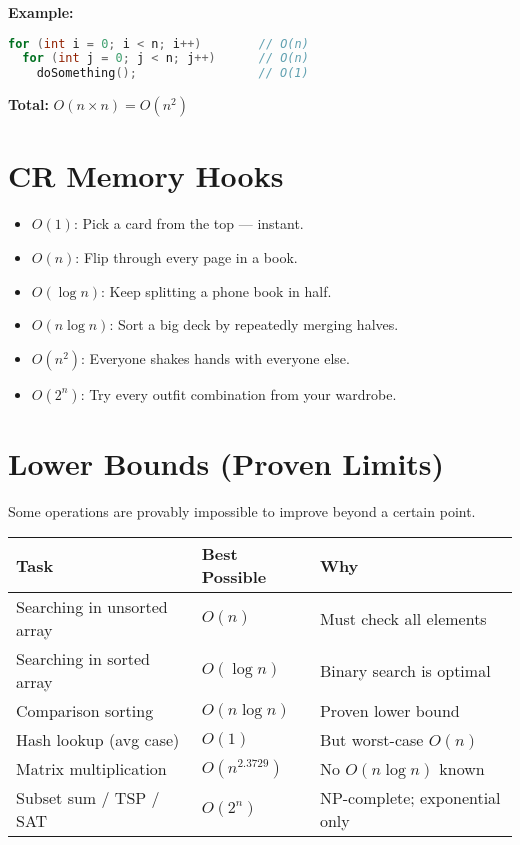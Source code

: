 \documentclass{article}
\begin{document}
\vspace{1em}
\textbf{Example:}
\begin{lstlisting}[language=C++]
for (int i = 0; i < n; i++)        // O(n)
  for (int j = 0; j < n; j++)      // O(n)
    doSomething();                 // O(1)
\end{lstlisting}

\textbf{Total: } \( O(n \times n) = O(n^2) \)

\section*{ CR Memory Hooks}

\begin{itemize}
    \item \( O(1) \): Pick a card from the top — instant.
    \item \( O(n) \): Flip through every page in a book.
    \item \( O(\log n) \): Keep splitting a phone book in half.
    \item \( O(n \log n) \): Sort a big deck by repeatedly merging halves.
    \item \( O(n^2) \): Everyone shakes hands with everyone else.
    \item \( O(2^n) \): Try every outfit combination from your wardrobe.
\end{itemize}

\section*{ Lower Bounds (Proven Limits)}

Some operations are provably impossible to improve beyond a certain point.

\begin{tabular}{|l|l|l|}
\hline
\textbf{Task}                  & \textbf{Best Possible} & \textbf{Why} \\
\hline
Searching in unsorted array   & \( O(n) \)             & Must check all elements \\
Searching in sorted array     & \( O(\log n) \)        & Binary search is optimal \\
Comparison sorting            & \( O(n \log n) \)      & Proven lower bound \\
Hash lookup (avg case)        & \( O(1) \)             & But worst-case \( O(n) \) \\
Matrix multiplication         & \( O(n^{2.3729}) \)    & No \( O(n \log n) \) known \\
Subset sum / TSP / SAT        & \( O(2^n) \)           & NP-complete; exponential only \\
\hline
\end{tabular}
\end{document}
